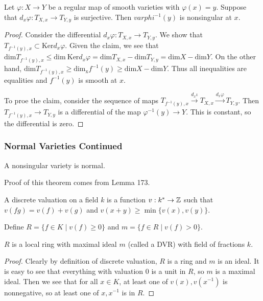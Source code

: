 \documentclass[twoside, 10pt]{article}
\begin{document}
        \begin{lem}
            Let $\varphi:X \to Y$ be a regular map of smooth varieties with $\varphi(x) = y$. Suppose that $d_x \varphi: T_{X,x} \to T_{Y,y}$ is surjective. Then $varphi^{-1}(y)$ is nonsingular at $x$.
            \begin{proof}
                Consider the differential $d_x \varphi: T_{X,x} \to T_{Y,y}$. We show that $T_{f^{-1}(y),x} \subset \mathrm{Ker} d_x \varphi$. Given the claim, we see that $\mathrm{dim} T_{f^{-1}(y),x} \leq \mathrm{dim}\ \mathrm{Ker} d_x \varphi = \mathrm{dim} T_{X,x} - \mathrm{dim}T_{Y,y} = \mathrm{dim}X - \mathrm{dim}Y$. On the other hand, $\mathrm{dim}T_{f^{-1}(y),x} \geq \mathrm{dim_x} f^{-1}(y) \geq \mathrm{dim}X - \mathrm{dim}Y$. Thus all inequalities are equalities and $f^{-1}(y)$ is smooth at $x$.

                To proe the claim, consider the sequence of maps $T_{f^{-1}(y),x} \overset{d_x \iota}{\to} T_{X,x} \overset{d_x \varphi}{\to} T_{Y,y}$. Then $T_{f^{-1}(y),x} \to T_{Y,y}$ is a differential of the map $\varphi^{-1}(y) \to Y$. This is constant, so the differential is zero.
            \end{proof}
        \end{lem}
        
        \subsubsection{Normal Varieties Continued}
        \begin{thm}
            A nonsingular variety is normal.
        \end{thm}
        Proof of this theorem comes from Lemma 173.

        \begin{defn}
            A discrete valuation on a field $k$ is a function $v: k^* \to \mathbb{Z}$ such that $v(fg) = v(f)+v(g)$ and $v(x+y) \geq \min\{v(x),v(y)\}$.

            Define $R = \{f \in K \mid v(f) \geq 0 \}$ and $m = \{ f \in R \mid v(f) > 0 \}$.
        \end{defn}

        \begin{lem}
            $R$ is a local ring with maximal ideal $m$ (called a DVR) with field of fractions $k$.
            \begin{proof}
                Clearly by definition of discrete valuation, $R$ is a ring and $m$ is an ideal. It is easy to see that everything with valuation $0$ is a unit in $R$, so $m$ is a maximal ideal. Then we see that for all $x \in K$, at least one of $v(x),v(x^{-1})$ is nonnegative, so at least one of $x,x^{-1}$ is in $R$.
            \end{proof}
        \end{lem}
\end{document}
